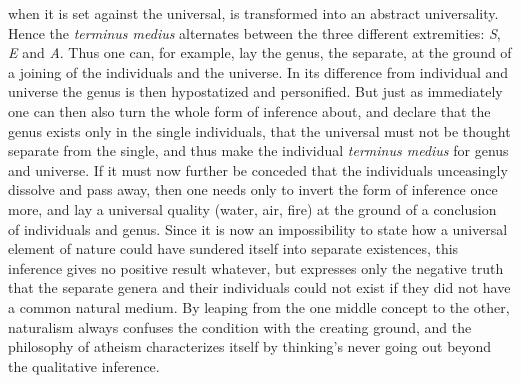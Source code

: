 \documentclass[12pt]{book}
\begin{document}
when it is set against the universal, is transformed into an abstract
universality. Hence the \textit{terminus medius} alternates between the
three different extremities: \textit{S}, \textit{E} and \textit{A}. Thus one
can, for example, lay the genus, the separate, at the ground of a joining of
the individuals and the universe. In its difference from individual and
universe the genus is then hypostatized and personified. But just as
immediately one can then also turn the whole form of inference about, and
declare that the genus exists only in the single individuals, that the
universal must not be thought separate from the single, and thus make the
individual \textit{terminus medius} for genus and universe. If it must now
further be conceded that the individuals unceasingly dissolve and pass away,
then one needs only to invert the form of inference once more, and lay a
universal quality (water, air, fire) at the ground of a conclusion of
individuals and genus. Since it is now an impossibility to state how a
universal element of nature could have sundered itself into separate
existences, this inference gives no positive result whatever, but expresses
only the negative truth that the separate genera and their individuals could
not exist if they did not have a common natural medium. By leaping from the
one middle concept to the other, naturalism always confuses the condition
with the creating ground, and the philosophy of atheism characterizes itself
by thinking's never going out beyond the qualitative inference.
\end{document}
